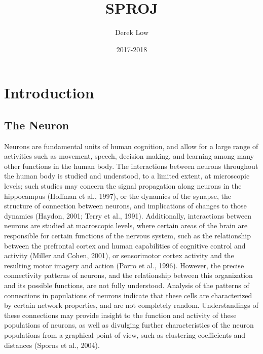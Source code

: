 \documentclass[11pt]{article}
\title{SPROJ}
\author{Derek Low}
\date{2017-2018}
\begin{document}
\maketitle

\section{Introduction}

\subsection{The Neuron}
Neurons are fundamental units of human cognition, and allow for a large range of activities such as movement, speech, decision making, and learning among many other functions in the human body. The interactions between neurons throughout the human body is studied and understood, to a limited extent, at microscopic levels; such studies may concern the signal propagation along neurons in the hippocampus (Hoffman et al., 1997), or the dynamics of the synapse, the structure of connection between neurons, and implications of changes to those dynamics (Haydon, 2001; Terry et al., 1991). Additionally, interactions between neurons are studied at macroscopic levels, where certain areas of the brain are responsible for certain functions of the nervous system, such as the relationship between the prefrontal cortex and human capabilities of cognitive control and activity (Miller and Cohen, 2001), or sensorimotor cortex activity and the resulting motor imagery and action (Porro et al., 1996). However, the precise connectivity patterns of neurons, and the relationship between this organization and its possible functions, are not fully understood. Analysis of the patterns of connections in populations of neurons indicate that these cells are characterized by certain network properties, and are not completely random. Understandings of these connections may provide insight to the function and activity of these populations of neurons, as well as divulging further characteristics of the neuron populations from a graphical point of view, such as clustering coefficients and distances (Sporns et al., 2004).\par
\end{document}
